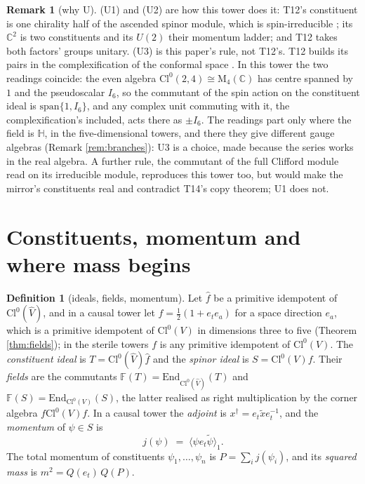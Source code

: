\documentclass[11pt]{article}
\theoremstyle{definition}
\newtheorem{definition}[theorem]{Definition}
\newtheorem{remark}[theorem]{Remark}
\newcommand{\Cl}{\mathrm{Cl}}
\newcommand{\C}{\mathbb{C}}
\newcommand{\HH}{\mathbb{H}}
\newcommand{\F}{\mathbb{F}}
\newcommand{\rev}[1]{\widetilde{#1}}
\newcommand{\ip}[1]{\langle #1 \rangle}
\newcommand{\hatV}{\widehat{V}}
\newcommand{\hf}{\hat{f}}
\newcommand{\Mat}{\mathrm{M}}
\begin{document}
\begin{remark}[why U]\label{rem:whyU}
(U1) and (U2) are how this tower does it: T12's constituent is one chirality half of the ascended spinor module, which is spin-irreducible \cite[Fact~2.2]{ButlerT12}; its $\C^{2}$ is two constituents and its $U(2)$ their momentum ladder; and T12 takes both factors' groups unitary. (U3) is this paper's rule, not T12's. T12 builds its pairs in the complexification of the conformal space \cite[Fact~2.2, Lem.~2.12]{ButlerT12}. In this tower the two readings coincide: the even algebra $\Cl^{0}(2,4) \cong \Mat_{4}(\C)$ \cite[Rem.~3.2]{ButlerT9} has centre spanned by $1$ and the pseudoscalar $I_{6}$, so the commutant of the spin action on the constituent ideal is $\mathrm{span}\{1, I_{6}\}$, and any complex unit commuting with it, the complexification's included, acts there as $\pm I_{6}$. The readings part only where the field is $\HH$, in the five-dimensional towers, and there they give different gauge algebras (Remark \ref{rem:branches}): U3 is a choice, made because the series works in the real algebra. A further rule, the commutant of the full Clifford module read on its irreducible module, reproduces this tower too, but would make the mirror's constituents real and contradict T14's copy theorem; U1 does not.
\end{remark}

\section{Constituents, momentum and where mass begins}\label{sec:constituents}

\begin{definition}[ideals, fields, momentum]\label{def:ideals}
Let $\hf$ be a primitive idempotent of $\Cl^{0}(\hatV)$, and in a causal tower let $f = \tfrac{1}{2}(1 + e_{t}e_{a})$ for a space direction $e_{a}$, which is a primitive idempotent of $\Cl^{0}(V)$ in dimensions three to five (Theorem \ref{thm:fields}); in the sterile towers $f$ is any primitive idempotent of $\Cl^{0}(V)$. The \emph{constituent ideal} is $T = \Cl^{0}(\hatV)\hf$ and the \emph{spinor ideal} is $S = \Cl^{0}(V)f$. Their \emph{fields} are the commutants $\F(T) = \mathrm{End}_{\Cl^{0}(\hatV)}(T)$ and $\F(S) = \mathrm{End}_{\Cl^{0}(V)}(S)$, the latter realised as right multiplication by the corner algebra $f\Cl^{0}(V)f$. In a causal tower the \emph{adjoint} is $x^{\dagger} = e_{t}\rev{x}e_{t}^{-1}$, and the \emph{momentum} of $\psi \in S$ is
\[
j(\psi) \;=\; \ip{\psi e_{t} \rev{\psi}}_{1}.
\]
The total momentum of constituents $\psi_{1}, \ldots, \psi_{n}$ is $P = \sum_{i} j(\psi_{i})$, and its \emph{squared mass} is $m^{2} = Q(e_{t})\,Q(P)$.
\end{definition}
\end{document}
